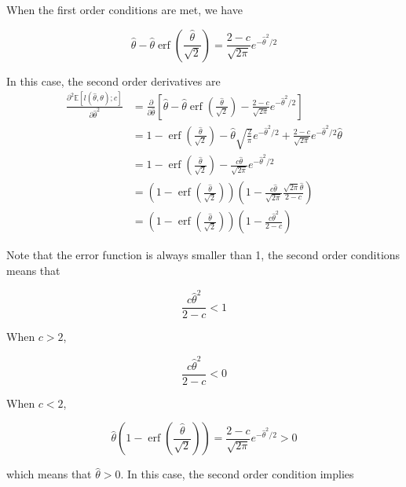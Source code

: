 \documentclass[11pt]{article}
\begin{document}
\begin{enumerate}
    When the first order conditions are met, we have
    
    \begin{equation}
        \hat{\theta} - \hat{\theta} \operatorname{erf}\left(\frac{\hat{\theta}}{\sqrt{2}}\right) = \frac{2-c}{\sqrt{2\pi}}  e^{-\hat{\theta}^2/2}
    \end{equation}

    In this case, the second order derivatives are
    $$
    \begin{aligned}
        \frac{\partial^2 \mathbb{E}[l(\hat{\theta}, \theta); c]}{\partial \hat{\theta}^2}
        &= \frac{\partial}{\partial \hat{\theta}} \left[\hat{\theta} - \hat{\theta} \operatorname{erf}\left(\frac{\hat{\theta}}{\sqrt{2}}\right) - \frac{2-c}{\sqrt{2\pi}}  e^{-\hat{\theta}^2/2}\right] \\
        &= 1 - \operatorname{erf}\left(\frac{\hat{\theta}}{\sqrt{2}}\right) - \hat{\theta} \sqrt{\frac{2}{\pi}} e^{-\hat{\theta}^2/2} + \frac{2-c}{\sqrt{2\pi}}  e^{-\hat{\theta}^2/2} \hat{\theta} \\
        &= 1 - \operatorname{erf}\left(\frac{\hat{\theta}}{\sqrt{2}}\right) - \frac{c\hat{\theta}}{\sqrt{2\pi}} e^{-\hat{\theta}^2/2} \\
        &= \left(1 - \operatorname{erf}\left(\frac{\hat{\theta}}{\sqrt{2}}\right)\right) \left(1 - \frac{c\hat{\theta}}{\sqrt{2\pi}} \frac{\sqrt{2\pi}\hat{\theta}}{2-c}\right) \\
        &= \left(1 - \operatorname{erf}\left(\frac{\hat{\theta}}{\sqrt{2}}\right)\right) \left(1 - \frac{c\hat{\theta}^2}{2-c}\right)
    \end{aligned}
    $$
    
    Note that the error function is always smaller than 1, the second order conditions means that

    \begin{equation}
        \frac{c\hat{\theta}^2}{2-c} < 1
    \end{equation}
    
    When $c>2$,

    $$
        \frac{c\hat{\theta}^2}{2-c} < 0
    $$

    When $c<2$, 

    $$
        \hat{\theta} \left(1 - \operatorname{erf}\left(\frac{\hat{\theta}}{\sqrt{2}}\right)\right) = \frac{2-c}{\sqrt{2\pi}}  e^{-\hat{\theta}^2/2} > 0
    $$
    
    which means that $\hat{\theta} > 0$. In this case,  the second order condition implies
    

\end{enumerate}
\end{document}
